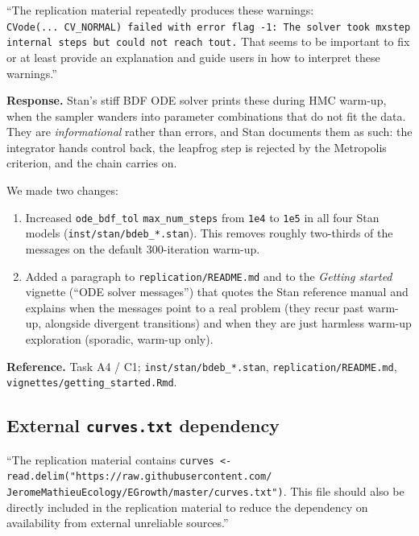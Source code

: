 \documentclass[11pt,a4paper]{article}
\newcommand{\code}[1]{\texttt{#1}}
\begin{document}
\begin{displayquote}
``The replication material repeatedly produces these warnings:
\code{CVode(...\ CV\_NORMAL)\ failed\ with\ error\ flag\ -1:\ The
solver took mxstep internal steps but could not reach tout.} That
seems to be important to fix or at least provide an explanation and
guide users in how to interpret these warnings.''
\end{displayquote}

\textbf{Response.} Stan's stiff BDF ODE solver prints these during HMC
warm-up, when the sampler wanders into parameter combinations that do not
fit the data. They are \emph{informational} rather than errors, and Stan
documents them as such: the integrator hands control back, the leapfrog
step is rejected by the Metropolis criterion, and the chain carries on.

We made two changes:

\begin{enumerate}[nosep]
\item Increased \code{ode\_bdf\_tol} \code{max\_num\_steps} from
  \code{1e4} to \code{1e5} in all four Stan models
  (\code{inst/stan/bdeb\_*.stan}). This removes roughly two-thirds of the
  messages on the default 300-iteration warm-up.
\item Added a paragraph to \code{replication/README.md} and to the
  \emph{Getting started} vignette (``ODE solver messages'') that quotes
  the Stan reference manual and explains when the messages point to a
  real problem (they recur past warm-up, alongside divergent
  transitions) and when they are just harmless warm-up exploration
  (sporadic, warm-up only).
\end{enumerate}

\textbf{Reference.} Task A4 / C1; \code{inst/stan/bdeb\_*.stan},
\code{replication/README.md}, \code{vignettes/getting\_started.Rmd}.

\subsection{External \code{curves.txt} dependency}

\begin{displayquote}
``The replication material contains
\verb|curves <- read.delim(|\allowbreak\verb|"https://raw.githubusercontent.com/|\allowbreak
\verb|JeromeMathieuEcology/|\allowbreak\verb|EGrowth/master/curves.txt")|.
This file should also be directly included in the replication material
to reduce the dependency on availability from external unreliable
sources.''
\end{displayquote}
\end{document}

